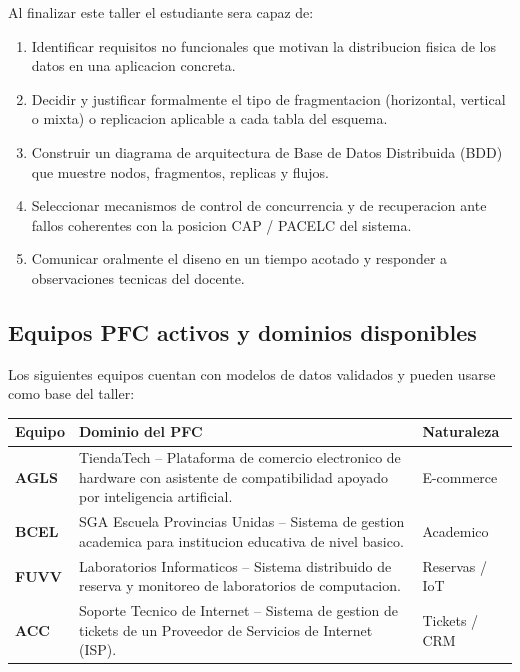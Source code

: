 \documentclass[11pt,a4paper]{article}
\begin{document}
Al finalizar este taller el estudiante sera capaz de:
\begin{enumerate}[label=\textbf{RA\arabic*:}]
\item Identificar requisitos no funcionales que motivan la distribucion fisica de los datos en una aplicacion concreta.
\item Decidir y justificar formalmente el tipo de fragmentacion (horizontal, vertical o mixta) o replicacion aplicable a cada tabla del esquema.
\item Construir un diagrama de arquitectura de Base de Datos Distribuida (BDD) que muestre nodos, fragmentos, replicas y flujos.
\item Seleccionar mecanismos de control de concurrencia y de recuperacion ante fallos coherentes con la posicion CAP / PACELC del sistema.
\item Comunicar oralmente el diseno en un tiempo acotado y responder a observaciones tecnicas del docente.
\end{enumerate}

\subsection{Equipos PFC activos y dominios disponibles}

Los siguientes equipos cuentan con modelos de datos validados y pueden usarse como base del taller:

\renewcommand{\arraystretch}{1.2}
\begin{xltabular}{\linewidth}{@{}lXl@{}}
\toprule
\textbf{Equipo} & \textbf{Dominio del PFC} & \textbf{Naturaleza} \\
\midrule
\textbf{AGLS} & TiendaTech -- Plataforma de comercio electronico de hardware con asistente de compatibilidad apoyado por inteligencia artificial. & E-commerce \\
\textbf{BCEL} & SGA Escuela Provincias Unidas -- Sistema de gestion academica para institucion educativa de nivel basico. & Academico \\
\textbf{FUVV} & Laboratorios Informaticos -- Sistema distribuido de reserva y monitoreo de laboratorios de computacion. & Reservas / IoT \\
\textbf{ACC} & Soporte Tecnico de Internet -- Sistema de gestion de tickets de un Proveedor de Servicios de Internet (ISP). & Tickets / CRM \\
\bottomrule
\end{xltabular}

\vspace{0.3em}
\end{document}
